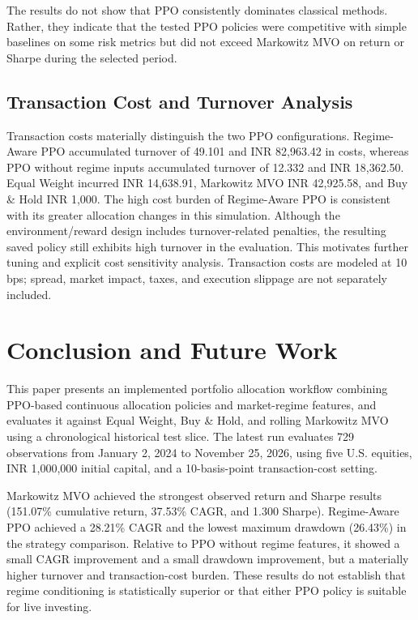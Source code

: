\documentclass[conference]{IEEEtran}
\begin{document}
The results do not show that PPO consistently dominates classical methods. Rather, they indicate that the tested PPO policies were competitive with simple baselines on some risk metrics but did not exceed Markowitz MVO on return or Sharpe during the selected period.

\subsection{Transaction Cost and Turnover Analysis}
Transaction costs materially distinguish the two PPO configurations. Regime-Aware PPO accumulated turnover of 49.101 and INR 82,963.42 in costs, whereas PPO without regime inputs accumulated turnover of 12.332 and INR 18,362.50. Equal Weight incurred INR 14,638.91, Markowitz MVO INR 42,925.58, and Buy \& Hold INR 1,000. The high cost burden of Regime-Aware PPO is consistent with its greater allocation changes in this simulation. Although the environment/reward design includes turnover-related penalties, the resulting saved policy still exhibits high turnover in the evaluation. This motivates further tuning and explicit cost sensitivity analysis. Transaction costs are modeled at 10 bps; spread, market impact, taxes, and execution slippage are not separately included.

\section{Conclusion and Future Work}
This paper presents an implemented portfolio allocation workflow combining PPO-based continuous allocation policies and market-regime features, and evaluates it against Equal Weight, Buy \& Hold, and rolling Markowitz MVO using a chronological historical test slice. The latest run evaluates 729 observations from January 2, 2024 to November 25, 2026, using five U.S. equities, INR 1,000,000 initial capital, and a 10-basis-point transaction-cost setting.

Markowitz MVO achieved the strongest observed return and Sharpe results (151.07\% cumulative return, 37.53\% CAGR, and 1.300 Sharpe). Regime-Aware PPO achieved a 28.21\% CAGR and the lowest maximum drawdown (26.43\%) in the strategy comparison. Relative to PPO without regime features, it showed a small CAGR improvement and a small drawdown improvement, but a materially higher turnover and transaction-cost burden. These results do not establish that regime conditioning is statistically superior or that either PPO policy is suitable for live investing.
\end{document}
